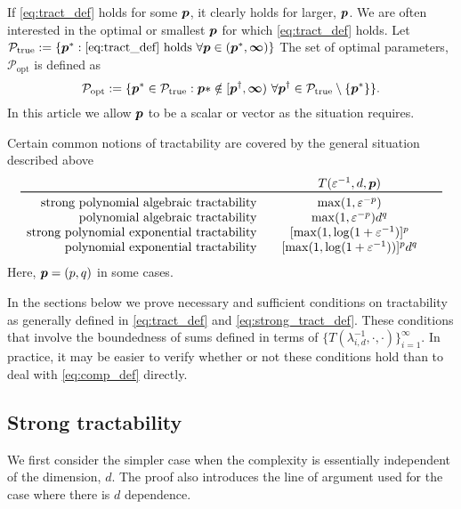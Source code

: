 \documentclass[11pt,a4paper]{article}
\begin{document}
If \eqref{eq:tract_def} holds for some $\boldsymbol{p}$, it clearly holds for larger, $\boldsymbol{p}$.  We are often interested in the optimal or smallest $\boldsymbol{p}$ for which \eqref{eq:tract_def} holds.  Let $\mathcal{P}_{\textup{true}} : = \{\boldsymbol{p}^* : \eqref{eq:tract_def} \text{ holds }\forall \boldsymbol{p} \in (\boldsymbol{p}^*,\boldsymbol{\infty})\}$
The  set of optimal parameters, $\mathcal{P}_{\text{opt}}$ is defined as
\begin{equation}
	\mathcal{P}_{\textup{opt}} : = \{\boldsymbol{p}^* \in \mathcal{P}_{\textup{true}} :  \boldsymbol{p}* \notin [\boldsymbol{p}^\dagger,\boldsymbol{\infty}) \ \forall \boldsymbol{p}^\dagger \in  \mathcal{P}_{\textup{true}} \setminus \{\boldsymbol{p}^*\} \}.
\end{equation}
In this article we allow $\boldsymbol{p}$ to be a scalar or vector as the situation requires.

Certain common notions of tractability are covered by the general situation described above
\begin{equation*}
	\begin{array}{r@{\qquad}c@{\qquad}c}
		& T(\varepsilon^{-1},d,\vp)\\
		\toprule
		\text{strong polynomial algebraic  tractability} & \max(1,\varepsilon^{-p})\\
		\text{polynomial algebraic tractability} & \max(1,\varepsilon^{-p})d^{q}\\
		\text{strong polynomial exponential tractability} &  [\max(1,\log(1 + \varepsilon^{-1})]^p\\
		\text{polynomial exponential tractability} &
		[\max(1,\log(1 + \varepsilon^{-1}))]^p  d^{q}
	\end{array}
\end{equation*}
Here, $\boldsymbol{p} = (p,q)$ in some cases.


In the sections below we prove necessary and sufficient conditions on tractability as generally defined in \eqref{eq:tract_def} and \eqref{eq:strong_tract_def}.  These conditions  that involve the boundedness of sums defined in terms of $\{T(\lambda_{i,d}^{-1},\cdot, \cdot)\}_{i=1}^\infty$.  In practice, it may be easier to verify whether or not these conditions hold than to deal with \eqref{eq:comp_def} directly.


\subsection{Strong tractability}

We first consider the simpler case when the complexity is essentially independent of the dimension, $d$.  The proof also introduces the line of argument used for the case where there is $d$ dependence.
\end{document}
